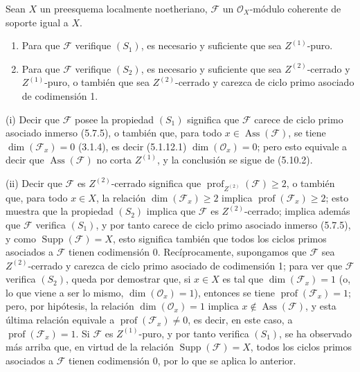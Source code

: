 \begin{proposition}[5.10.14]
\label{IV.2.s5.10.14-fr}
Sean $X$ un preesquema localmente noetheriano, $\mathcal F$ un
$\mathcal O_X$-módulo coherente de soporte igual a $X$.
\begin{enumerate}
\item[\textup{(i)}] Para que $\mathcal F$ verifique $(S_1)$, es necesario y suficiente
que sea $Z^{(1)}$-puro.
\item[\textup{(ii)}] Para que $\mathcal F$ verifique $(S_2)$, es necesario y suficiente
que sea $Z^{(2)}$-cerrado y $Z^{(1)}$-puro, o también que sea $Z^{(2)}$-cerrado
y carezca de ciclo primo asociado de codimensión 1.
\end{enumerate}
\end{proposition}

(i) Decir que $\mathcal F$ posee la propiedad $(S_1)$ significa que
$\mathcal F$ carece de ciclo primo asociado inmerso (5.7.5), o también que,
para todo $x\in\operatorname{Ass}(\mathcal F)$, se tiene
$\dim(\mathcal F_x)=0$ (3.1.4), es decir (5.1.12.1)
$\dim(\mathcal O_x)=0$; pero esto equivale a decir que
$\operatorname{Ass}(\mathcal F)$ no corta $Z^{(1)}$, y la conclusión se sigue
de (5.10.2).

(ii) Decir que $\mathcal F$ es $Z^{(2)}$-cerrado significa que
$\operatorname{prof}_{Z^{(2)}}(\mathcal F)\geq2$, o también que, para todo
$x\in X$, la relación $\dim(\mathcal F_x)\geq2$ implica
$\operatorname{prof}(\mathcal F_x)\geq2$; esto muestra que la propiedad
$(S_2)$ implica que $\mathcal F$ es $Z^{(2)}$-cerrado; implica además que
$\mathcal F$ verifica $(S_1)$, y por tanto carece de ciclo primo asociado
inmerso (5.7.5), y como $\operatorname{Supp}(\mathcal F)=X$, esto significa
también que todos los ciclos primos asociados a $\mathcal F$ tienen
codimensión 0. Recíprocamente, supongamos que $\mathcal F$ sea
$Z^{(2)}$-cerrado y carezca de ciclo primo asociado de codimensión 1; para ver
que $\mathcal F$ verifica $(S_2)$, queda por demostrar que, si $x\in X$ es tal
que $\dim(\mathcal F_x)=1$ (o, lo que viene a ser lo mismo,
$\dim(\mathcal O_x)=1$), entonces se tiene
$\operatorname{prof}(\mathcal F_x)=1$; pero, por hipótesis, la relación
$\dim(\mathcal O_x)=1$ implica $x\notin\operatorname{Ass}(\mathcal F)$, y
esta última relación equivale a $\operatorname{prof}(\mathcal F_x)\neq0$, es
decir, en este caso, a $\operatorname{prof}(\mathcal F_x)=1$. Si $\mathcal F$
es $Z^{(1)}$-puro, y por tanto verifica $(S_1)$, se ha observado más arriba que,
en virtud de la relación $\operatorname{Supp}(\mathcal F)=X$, todos los ciclos
primos asociados a $\mathcal F$ tienen codimensión 0, por lo que se aplica lo
anterior.

